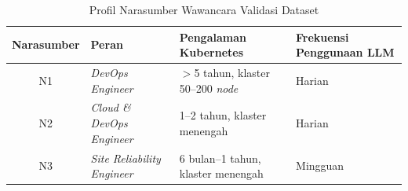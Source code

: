 \renewcommand{\arraystretch}{1.1}
\captionsetup[table]{justification=raggedright,singlelinecheck=false}
\begin{table}[H]
\caption{Profil Narasumber Wawancara Validasi Dataset}
\label{tbl:expert_profile}
\centering
\begin{tabular}{| c | p{} | p{} | p{} |}
\hline
\textbf{Narasumber} & \textbf{Peran} & \textbf{Pengalaman Kubernetes} & \textbf{Frekuensi Penggunaan LLM} \\
\hline
N1 & \textit{DevOps Engineer} & $>$5 tahun, klaster 50--200 \textit{node} & Harian \\
\hline
N2 & \textit{Cloud \& DevOps Engineer} & 1--2 tahun, klaster menengah & Harian \\
\hline
N3 & \textit{Site Reliability Engineer} & 6 bulan--1 tahun, klaster menengah & Mingguan \\
\hline
\end{tabular}
\end{table}
